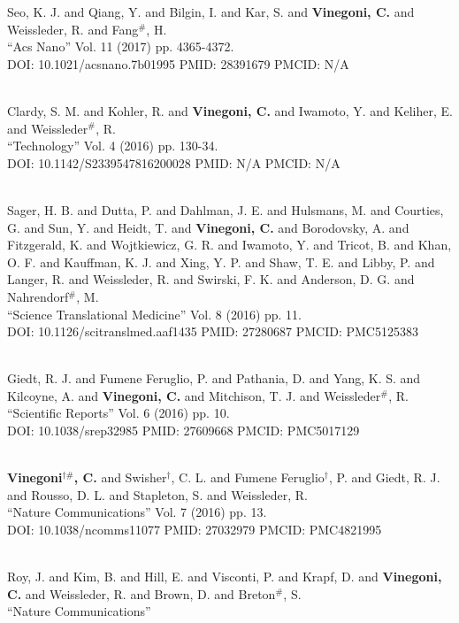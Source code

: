 Seo, K. J. and Qiang, Y. and Bilgin, I. and Kar, S. and {\bf Vinegoni, C.} and Weissleder, R. and Fang$^\#$, H. \\ ``Acs Nano'' Vol. 11 (2017) pp. 4365-4372. \\ DOI: 10.1021/acsnano.7b01995 PMID: 28391679 PMCID: N/A\item {} \\ Clardy, S. M. and Kohler, R. and {\bf Vinegoni, C.} and Iwamoto, Y. and Keliher, E. and Weissleder$^\#$, R. \\ ``Technology'' Vol. 4 (2016) pp. 130-34. \\ DOI: 10.1142/S2339547816200028 PMID: N/A PMCID: N/A\item {} \\ Sager, H. B. and Dutta, P. and Dahlman, J. E. and Hulsmans, M. and Courties, G. and Sun, Y. and Heidt, T. and {\bf Vinegoni, C.} and Borodovsky, A. and Fitzgerald, K. and Wojtkiewicz, G. R. and Iwamoto, Y. and Tricot, B. and Khan, O. F. and Kauffman, K. J. and Xing, Y. P. and Shaw, T. E. and Libby, P. and Langer, R. and Weissleder, R. and Swirski, F. K. and Anderson, D. G. and Nahrendorf$^\#$, M. \\ ``Science Translational Medicine'' Vol. 8 (2016) pp. 11. \\ DOI: 10.1126/scitranslmed.aaf1435 PMID: 27280687 PMCID: PMC5125383\item {} \\ Giedt, R. J. and Fumene Feruglio, P. and Pathania, D. and Yang, K. S. and Kilcoyne, A. and {\bf Vinegoni, C.} and Mitchison, T. J. and Weissleder$^\#$, R. \\ ``Scientific Reports'' Vol. 6 (2016) pp. 10. \\ DOI: 10.1038/srep32985 PMID: 27609668 PMCID: PMC5017129\item {} \\ {\bf Vinegoni$^{\dag \#}$, C.} and Swisher$^\dag$, C. L. and Fumene Feruglio$^\dag$, P. and Giedt, R. J. and Rousso, D. L. and Stapleton, S. and Weissleder, R. \\ ``Nature Communications'' Vol. 7 (2016) pp. 13. \\ DOI: 10.1038/ncomms11077 PMID: 27032979 PMCID: PMC4821995\item {} \\ Roy, J. and Kim, B. and Hill, E. and Visconti, P. and Krapf, D. and {\bf Vinegoni, C.} and Weissleder, R. and Brown, D. and Breton$^\#$, S. \\ ``Nature Communications'' 